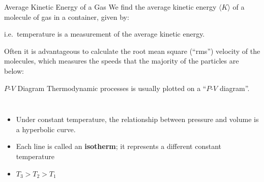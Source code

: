 \documentclass[12pt,aspectratio=169]{beamer}
\newcommand{\eq}[2]{\vspace{#1}{\Large\begin{displaymath}#2\end{displaymath}}}
\begin{document}
\begin{frame}{Average Kinetic Energy of a Gas}
  We find the average kinetic energy $\langle K \rangle$ of a molecule of gas
  in a container, given by:
  
  \eq{-.2in}{
    \boxed{\big\langle K\big\rangle=\frac{3}{2}kT}
  }

  i.e.\ temperature is a measurement of the average kinetic energy.

  \vspace{.15in}Often it is advantageous to calculate the root mean square
  (``rms'') velocity of the molecules, which measures the speeds that the
  majority of the particles are below:

  \eq{-.2in}{
    v_\mathrm{rms}=\sqrt{\frac{3kT}{m}}
  }
\end{frame}



\begin{frame}{$P$-$V$ Diagram}
  Thermodynamic processes is usually plotted on a ``$P$-$V$ diagram''.
  \begin{columns}

    \begin{itemize}
    \item Under constant temperature, the relationship between pressure and
      volume is a hyperbolic curve.
    \item Each line is called an \textbf{isotherm}; it represents a different
      constant temperature
    \item $T_3>T_2>T_1$
    \end{itemize}
  \end{columns}
  
\end{frame}
\end{document}
